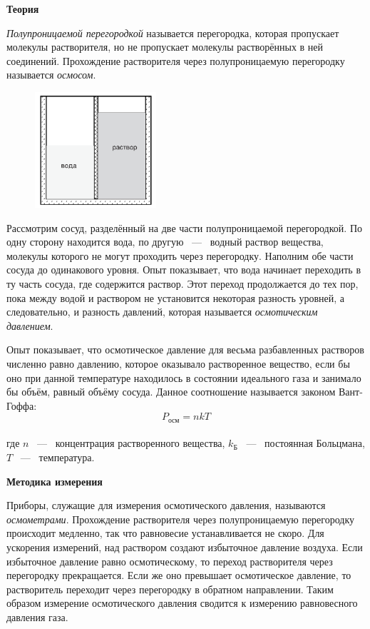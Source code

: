 \textbf{\Large Теория}

\textit{Полупроницаемой перегородкой} называется перегородка, которая пропускает молекулы растворителя, но не пропускает молекулы растворённых в ней соединений. Прохождение растворителя через полупроницаемую перегородку называется \textit{осмосом}.

\begin{figure}
	\centering
	\includegraphics[width=0.4\textwidth]{../images/scheme_theory.png}
\end{figure}

Рассмотрим сосуд, разделённый на две части полупроницаемой перегородкой. По одну сторону находится вода, по другую ~---~ водный раствор вещества, молекулы которого не могут проходить через перегородку. Наполним обе части сосуда до одинакового уровня. Опыт показывает, что вода начинает переходить в ту часть сосуда, где содержится раствор. Этот переход продолжается до тех пор, пока между водой и раствором не установится некоторая разность уровней, а следовательно, и разность давлений, которая называется \textit{осмотическим давлением}.

Опыт показывает, что осмотическое давление для весьма разбавленных растворов численно равно давлению, которое оказывало растворенное вещество, если бы оно при данной температуре находилось в состоянии идеального газа и занимало бы объём, равный объёму сосуда. Данное соотношение называется законом Вант-Гоффа:
$$
P_{осм} = n k T
$$ \\
где $n$ ~---~ концентрация растворенного вещества, $k_Б$ ~---~ постоянная Больцмана, $T$ ~---~ температура.

\newpage

\textbf{\Large Методика измерения}

Приборы, служащие для измерения осмотического давления, называются \textit{осмометрами}. Прохождение растворителя через полупроницаемую перегородку происходит медленно, так что равновесие устанавливается не скоро. Для ускорения измерений, над раствором создают избыточное давление воздуха. Если избыточное давление равно осмотическому, то переход растворителя через перегородку прекращается. Если же оно превышает осмотическое давление, то растворитель переходит через перегородку в обратном направлении. Таким образом измерение осмотического давления сводится к измерению равновесного давления газа.

